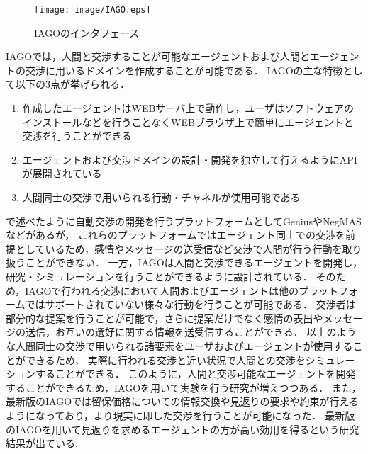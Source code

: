\begin{figure}[htb]
    \centering
    \texttt{[image: image/IAGO.eps]}
    \caption{IAGOのインタフェース}
    \label{fig:iago}
\end{figure}

IAGOでは，人間と交渉することが可能なエージェントおよび人間とエージェントの交渉に用いるドメインを作成することが可能である．
IAGOの主な特徴として以下の3点が挙げられる\cite{pinocchio}．

\begin{enumerate}
    \item 作成したエージェントはWEBサーバ上で動作し，ユーザはソフトウェアのインストールなどを行うことなくWEBブラウザ上で簡単にエージェントと交渉を行うことができる
    \item エージェントおよび交渉ドメインの設計・開発を独立して行えるようにAPIが展開されている
    \item 人間同士の交渉で用いられる行動・チャネルが使用可能である
\end{enumerate}

で述べたように自動交渉の開発を行うプラットフォームとしてGenius\cite{genius}やNegMAS\cite{negmas}などがあるが，
これらのプラットフォームではエージェント同士での交渉を前提としているため，感情やメッセージの送受信など交渉で人間が行う行動を取り扱うことができない．
一方，IAGOは人間と交渉できるエージェントを開発し，研究・シミュレーションを行うことができるように設計されている．
そのため，IAGOで行われる交渉において人間およびエージェントは他のプラットフォームではサポートされていない様々な行動を行うことが可能である．
交渉者は部分的な提案を行うことが可能で，さらに提案だけでなく感情の表出やメッセージの送信，お互いの選好に関する情報を送受信することができる．
以上のような人間同士の交渉で用いられる諸要素をユーザおよびエージェントが使用することができるため，
実際に行われる交渉と近い状況で人間との交渉をシミュレーションすることができる．
このように，人間と交渉可能なエージェントを開発することができるため，IAGOを用いて実験を行う研究が増えつつある．
また，最新版のIAGOでは留保価格についての情報交換や見返りの要求や約束が行えるようになっており，より現実に即した交渉を行うことが可能になった．
最新版のIAGOを用いて見返りを求めるエージェントの方が高い効用を得るという研究結果が出ている\cite{favor}.

